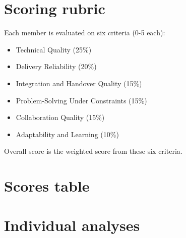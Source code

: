 \section{Scoring rubric}


\noindent Each member is evaluated on six criteria (0-5 each):

\begin{itemize}[leftmargin=1.5em]
\item Technical Quality (25\%)
\item Delivery Reliability (20\%)
\item Integration and Handover Quality (15\%)
\item Problem-Solving Under Constraints (15\%)
\item Collaboration Quality (15\%)
\item Adaptability and Learning (10\%)
\end{itemize}

\noindent Overall score is the weighted score from these six criteria.


\section{Scores table}


\begin{table}[H]
\centering
\small
\setlength{\tabcolsep}{4pt}
\renewcommand{\arraystretch}{1.1}
\end{table}


\section{Individual analyses}


